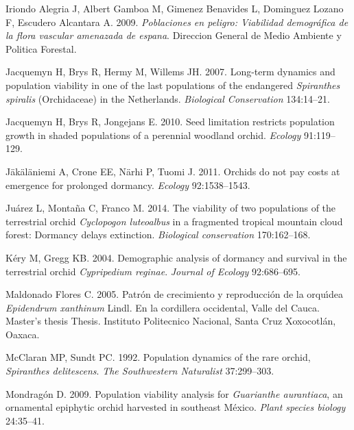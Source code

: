 \documentclass[
  12pt,
  letterpaper,
]{book}
\newlength{\cslhangindent}
\newenvironment{CSLReferences}[2] %
 {\begin{list}{}{%
  \setlength{\itemindent}{0pt}
  \setlength{\leftmargin}{0pt}
  \setlength{\parsep}{0pt}
  \ifodd #1
   \setlength{\leftmargin}{\cslhangindent}
   \setlength{\itemindent}{-1\cslhangindent}
  \fi
  \setlength{\itemsep}{#2\baselineskip}}}
 {\end{list}}
\begin{document}
\begin{CSLReferences}{1}{0}
Iriondo Alegria J, Albert Gamboa M, Gimenez Benavides L, Dominguez
Lozano F, Escudero Alcantara A. 2009. \emph{Poblaciones en peligro:
Viabilidad demogr{á}fica de la flora vascular amenazada de espana}.
Direccion General de Medio Ambiente y Politica Forestal.

Jacquemyn H, Brys R, Hermy M, Willems JH. 2007. Long-term dynamics and
population viability in one of the last populations of the endangered
\emph{{S}piranthes spiralis} ({O}rchidaceae) in the {N}etherlands.
\emph{Biological Conservation} 134:14--21.

Jacquemyn H, Brys R, Jongejans E. 2010. Seed limitation restricts
population growth in shaded populations of a perennial woodland orchid.
\emph{Ecology} 91:119--129.

Jäkäläniemi A, Crone EE, Närhi P, Tuomi J. 2011. Orchids do not pay
costs at emergence for prolonged dormancy. \emph{Ecology} 92:1538--1543.

Juárez L, Montaña C, Franco M. 2014. The viability of two populations of
the terrestrial orchid \emph{{C}yclopogon {l}uteoalbus} in a fragmented
tropical mountain cloud forest: Dormancy delays extinction.
\emph{Biological conservation} 170:162--168.

Kéry M, Gregg KB. 2004. Demographic analysis of dormancy and survival in
the terrestrial orchid \emph{{C}ypripedium {r}eginae}. \emph{Journal of
Ecology} 92:686--695.

Maldonado Flores C. 2005. Patr{ó}n de crecimiento y reproducci{ó}n de la
orqu{ı́}dea \emph{{E}pidendrum {x}anthinum} {L}indl. En la cordillera
occidental, {V}alle del {C}auca. Master's thesis Thesis. Instituto
Politecnico Nacional, Santa Cruz Xoxocotlán, Oaxaca.

McClaran MP, Sundt PC. 1992. Population dynamics of the rare orchid,
\emph{{S}piranthes {d}elitescens}. \emph{The Southwestern Naturalist}
37:299--303.

Mondragón D. 2009. Population viability analysis for \emph{{G}uarianthe
{a}urantiaca}, an ornamental epiphytic orchid harvested in southeast
{M}{é}xico. \emph{Plant species biology} 24:35--41.


\end{CSLReferences}
\end{document}
